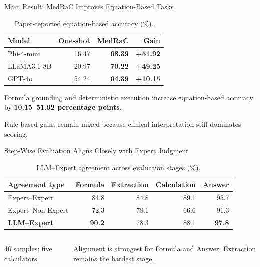\begin{frame}{Main Result: MedRaC Improves Equation-Based Tasks}
  \raggedright
  \begin{table}
    \caption{Paper-reported equation-based accuracy (\%).}
    \label{tab:selected-paper-results}
    \begin{tabular}{lrrr}
      \toprule
      Model & One-shot & MedRaC & Gain \\
      \midrule
      Phi-4-mini & 16.47 & \textbf{68.39} & \textbf{+51.92} \\
      LLaMA3.1-8B & 20.97 & \textbf{70.22} & \textbf{+49.25} \\
      GPT-4o & 54.24 & \textbf{64.39} & \textbf{+10.15} \\
      \bottomrule
    \end{tabular}
  \end{table}
  \vspace{0.18cm}
  \par\vspace{0.08cm}
  Formula grounding and deterministic execution increase equation-based accuracy by \textbf{10.15--51.92 percentage points}.\par\vspace{0.18cm}
  \small Rule-based gains remain mixed because clinical interpretation still dominates scoring.
\end{frame}

\begin{frame}{Step-Wise Evaluation Aligns Closely with Expert Judgment}
  \raggedright
  \begin{table}
    \caption{LLM--Expert agreement across evaluation stages (\%).}
    \label{tab:llm-expert-agreement}
    \begin{tabular}{lrrrr}
      \toprule
      Agreement type & Formula & Extraction & Calculation & Answer \\
      \midrule
      Expert--Expert & 84.8 & 84.8 & 89.1 & 95.7 \\
      Expert--Non-Expert & 72.3 & 78.1 & 66.6 & 91.3 \\
      \textbf{LLM--Expert} & \textbf{90.2} & 78.3 & 88.1 & \textbf{97.8} \\
      \bottomrule
    \end{tabular}
  \end{table}
  \vspace{0.28cm}
  \begin{columns}[T,onlytextwidth]
      \par
      46 samples; five calculators.
      \par
      Alignment is strongest for Formula and Answer; Extraction remains the hardest stage.
  \end{columns}
\end{frame}

